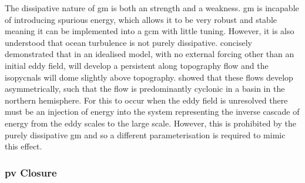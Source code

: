 \documentclass[10pt,a4paper]{article}
\begin{document}
        The dissipative nature of \gls{gm} is both an strength and a
         weakness. \gls{gm} is incapable of introducing spurious energy,
         which allows it to be very robust and stable meaning it can be implemented 
         into a \gls{gcm} with little tuning. However, it is also understood that
         ocean turbulence is not purely dissipative.
          \cite{adcock2000interactions} concisely demonstrated that
         in an idealised model, with no external forcing other
         than an initial eddy field, will develop a persistent along
         topography flow and the isopycnals will dome slightly above topography.
          \cite{nost2008asymmetry} showed that these
         flows develop asymmetrically, such that the flow is 
         predominantly cyclonic in
         a basin in the northern hemisphere. For this to occur 
         when the eddy field is unresolved there must be an 
         injection of energy into the system representing the 
         inverse cascade of energy from the eddy scales to the large scale.
         However, this is prohibited by the purely dissipative \gls{gm}
         and so a different parameterisation is required to mimic this
         effect.
         
         
         
         \subsubsection{\gls{pv} Closure}
         
\end{document}
